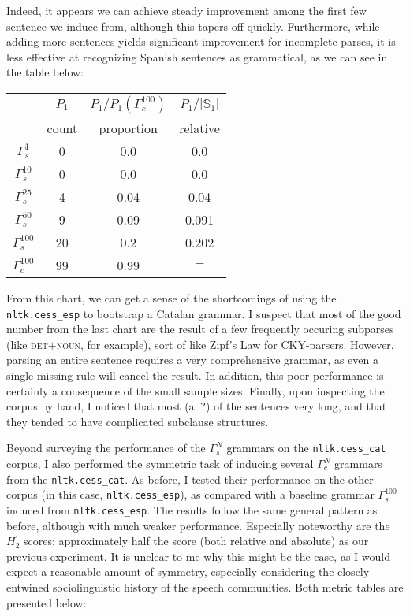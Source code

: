 \documentclass[paper=a4, fontsize=11pt]{scrartcl} %
\newcommand{\gcat}{\Gamma_{c}}
\newcommand{\gesp}{\Gamma_{s}}
\begin{document}
Indeed, it appears we can achieve steady improvement among the first few sentence we induce from, although this tapers off quickly.  Furthermore, while adding more sentences yields significant improvement for incomplete parses, it is less effective at recognizing Spanish sentences as grammatical, as we can see in the table below:

\begin{center}
    \begin{tabular}{||c||ccc||}
        \hline\hline
        & $P_1$ & $P_1/P_1(\gcat^{100})$ & $P_1/|\mathbb{S}_1|$ \\
        & count & proportion & relative \\
        \hline\hline
        $\gesp^{1}$ & 0 & 0.0 & 0.0 \\ %
        $\gesp^{10}$ & 0 & 0.0 & 0.0 \\ %
        $\gesp^{25}$ & 4 & 0.04 & 0.04 \\ %
        $\gesp^{50}$ & 9 & 0.09 & 0.091 \\ %
        $\gesp^{100}$ & 20 & 0.2 & 0.202 \\ %
        \hline
        $\gcat^{100}$ & 99 & 0.99 & $-$ \\ %
        \hline\hline
    \end{tabular}
\end{center}

From this chart, we can get a sense of the shortcomings of using the \texttt{nltk.cess\_esp} to bootstrap a Catalan grammar.  I suspect that most of the good number from the last chart are the result of a few frequently occuring subparses (like \textsc{det}$+$\textsc{noun}, for example), sort of like Zipf's Law for CKY-parsers.  However, parsing an entire sentence requires a very comprehensive grammar, as even a single missing rule will cancel the result.  In addition, this poor performance is certainly a consequence of the small sample sizes.  Finally, upon inspecting the corpus by hand, I noticed that most (all?) of the sentences very long, and that they tended to have complicated subclause structures.

Beyond surveying the performance of the $\gesp^N$ grammars on the \texttt{nltk.cess\_cat} corpus, I also performed the symmetric task of inducing several $\gcat^N$ grammars from the \texttt{nltk.cess\_cat}.  As before, I tested their performance on the other corpus (in this case, \texttt{nltk.cess\_esp}), as compared with a baseline grammar $\gesp^{100}$ induced from \texttt{nltk.cess\_esp}.  The results follow the same general pattern as before, although with much weaker performance.  Especially noteworthy are the $H_2^\prime$ scores: approximately half the score (both relative and absolute) as our previous experiment.  It is unclear to me why this might be the case, as I would expect a reasonable amount of symmetry, especially considering the closely entwined sociolinguistic history of the speech communities.  Both metric tables are presented below:
\end{document}
